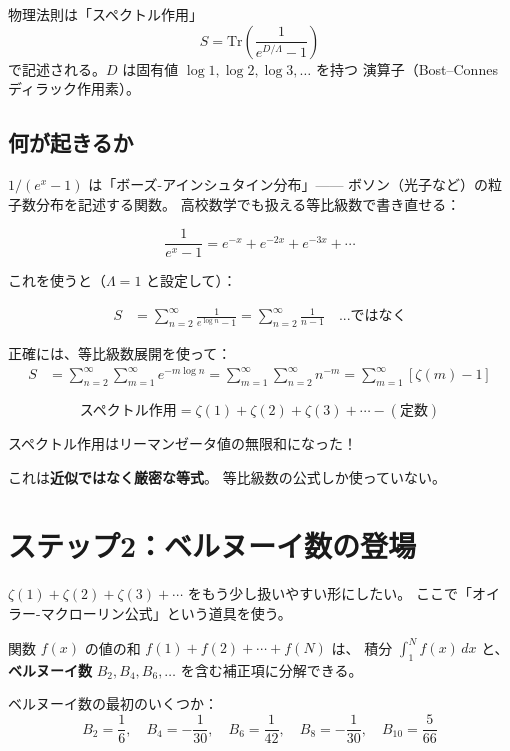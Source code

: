 \documentclass[11pt,a4paper]{article}
\begin{document}
\begin{resultbox}[公理 II: スペクトル力学]
物理法則は「スペクトル作用」
$$S = \text{Tr}\!\left(\frac{1}{e^{D/\Lambda} - 1}\right)$$
で記述される。$D$ は固有値 $\log 1, \log 2, \log 3, \ldots$ を持つ
演算子（Bost--Connes ディラック作用素）。
\end{resultbox}

\subsection{何が起きるか}

$1/(e^x - 1)$ は「ボーズ-アインシュタイン分布」——
ボソン（光子など）の粒子数分布を記述する関数。
高校数学でも扱える等比級数で書き直せる：

$$\frac{1}{e^x - 1} = e^{-x} + e^{-2x} + e^{-3x} + \cdots$$

これを使うと（$\Lambda = 1$ と設定して）：

\begin{align*}
S &= \sum_{n=2}^{\infty} \frac{1}{e^{\log n} - 1}
= \sum_{n=2}^{\infty} \frac{1}{n - 1} \quad \text{...ではなく}
\end{align*}

正確には、等比級数展開を使って：
\begin{align*}
S &= \sum_{n=2}^{\infty}\sum_{m=1}^{\infty} e^{-m \log n}
= \sum_{m=1}^{\infty}\sum_{n=2}^{\infty} n^{-m}
= \sum_{m=1}^{\infty} [\zeta(m) - 1]
\end{align*}

\begin{resultbox}
$$\text{スペクトル作用} = \zeta(1) + \zeta(2) + \zeta(3) + \cdots - (\text{定数})$$

スペクトル作用はリーマンゼータ値の無限和になった！

これは\textbf{近似ではなく厳密な等式}。
等比級数の公式しか使っていない。
\end{resultbox}

\section{ステップ2：ベルヌーイ数の登場}

$\zeta(1) + \zeta(2) + \zeta(3) + \cdots$ をもう少し扱いやすい形にしたい。
ここで「オイラー-マクローリン公式」という道具を使う。

\begin{mathbox}
関数 $f(x)$ の値の和 $f(1) + f(2) + \cdots + f(N)$ は、
積分 $\int_1^N f(x)\,dx$ と、\textbf{ベルヌーイ数} $B_2, B_4, B_6, \ldots$
を含む補正項に分解できる。

ベルヌーイ数の最初のいくつか：
$$B_2 = \frac{1}{6},\quad B_4 = -\frac{1}{30},\quad B_6 = \frac{1}{42},\quad B_8 = -\frac{1}{30},\quad B_{10} = \frac{5}{66}$$
\end{mathbox}
\end{document}

